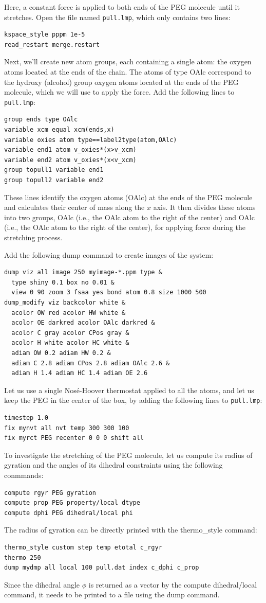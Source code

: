 \documentclass[9pt,tutorial]{livecoms}
\newcommand{\lmpcmd}[1]{\hspace{0pt}\colorbox{listing}{\textcolor{command}{\small{#1}}}\hspace{0pt}} %
\newcommand{\flecmd}[1]{\textcolor{command}{\texttt{#1}}} %
\begin{document}
Here, a constant force is applied to both ends of the PEG molecule until it
stretches.  Open the file named \flecmd{pull.lmp}, which 
only contains two lines:
\begin{lstlisting}
kspace_style pppm 1e-5
read_restart merge.restart
\end{lstlisting}
Next, we'll create new atom groups, each containing a single atom: the oxygen
atoms located at the ends of the chain.  The atoms of type \lmpcmd{OAlc}
correspond to the hydroxy (alcohol) group oxygen atoms located at the ends
of the PEG molecule, which we will use to apply the force.  Add the
following lines to \flecmd{pull.lmp}:
\begin{lstlisting}
group ends type OAlc
variable xcm equal xcm(ends,x)
variable oxies atom type==label2type(atom,OAlc)
variable end1 atom v_oxies*(x>v_xcm)
variable end2 atom v_oxies*(x<v_xcm)
group topull1 variable end1
group topull2 variable end2
\end{lstlisting}
These lines identify the oxygen atoms (\lmpcmd{OAlc}) at the ends of the PEG
molecule and calculates their center of mass along the $x$ axis.  It then
divides these atoms into two groups, \lmpcmd{OAlc} (i.e., the OAlc atom to
the right of the center) and \lmpcmd{OAlc} (i.e., the OAlc atom to the right
of the center), for applying force during the stretching process.

Add the following \lmpcmd{dump} command to create images of the system:
\begin{lstlisting}
dump viz all image 250 myimage-*.ppm type &
  type shiny 0.1 box no 0.01 &
  view 0 90 zoom 3 fsaa yes bond atom 0.8 size 1000 500 
dump_modify viz backcolor white &
  acolor OW red acolor HW white &
  acolor OE darkred acolor OAlc darkred &
  acolor C gray acolor CPos gray &
  acolor H white acolor HC white &
  adiam OW 0.2 adiam HW 0.2 &
  adiam C 2.8 adiam CPos 2.8 adiam OAlc 2.6 &
  adiam H 1.4 adiam HC 1.4 adiam OE 2.6
\end{lstlisting}
Let us use a single Nosé-Hoover thermostat applied to all the atoms,
and let us keep the PEG in the center of the box, by adding
the following lines to \flecmd{pull.lmp}:
\begin{lstlisting}
timestep 1.0
fix mynvt all nvt temp 300 300 100
fix myrct PEG recenter 0 0 0 shift all
\end{lstlisting}

To investigate the stretching of the PEG molecule, let us compute its radius of
gyration \cite{fixmanRadiusGyrationPolymer1962a} and the angles of its dihedral
constraints using the following conmmands:
\begin{lstlisting}
compute rgyr PEG gyration
compute prop PEG property/local dtype
compute dphi PEG dihedral/local phi
\end{lstlisting}
The radius of gyration can be directly printed with the \lmpcmd{thermo\_style} command:
\begin{lstlisting}
thermo_style custom step temp etotal c_rgyr
thermo 250
dump mydmp all local 100 pull.dat index c_dphi c_prop
\end{lstlisting}
Since the dihedral angle $\phi$ is returned as a vector by the compute
\lmpcmd{dihedral/local} command, it needs to be printed to a file using
the \lmpcmd{dump} command.
\end{document}
